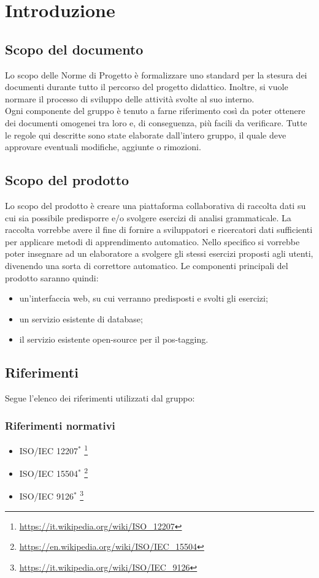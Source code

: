 \documentclass[11pt,a4paper]{article}
\begin{document}
	\newpage	

	\renewcommand  \contentsname {\Large Indice} 
	
	\tableofcontents
	\newpage
	
	\section{Introduzione}
	\subsection{Scopo del documento}
	Lo scopo delle Norme di Progetto è formalizzare uno standard per la stesura dei documenti durante tutto il percorso del progetto didattico. Inoltre, si vuole normare il processo di sviluppo delle attività svolte al suo interno. 
	\\Ogni componente del gruppo è tenuto a farne riferimento così da poter ottenere dei documenti omogenei tra loro e, di conseguenza, più facili da verificare. 
	Tutte le regole qui descritte sono state elaborate dall'intero gruppo, il quale deve approvare eventuali modifiche, aggiunte o rimozioni.
	\subsection{Scopo del prodotto}
	Lo scopo del prodotto è creare una piattaforma collaborativa di raccolta dati su cui sia possibile predisporre e/o svolgere esercizi di analisi grammaticale. La raccolta vorrebbe avere il fine di fornire a sviluppatori e ricercatori dati sufficienti per applicare metodi di apprendimento automatico. Nello specifico si vorrebbe poter insegnare ad un elaboratore a svolgere gli stessi esercizi proposti agli utenti, divenendo una sorta di correttore automatico.  
	Le componenti principali del prodotto saranno quindi:
	\begin{itemize}
		\item un'interfaccia web, su cui verranno predisposti e svolti gli esercizi;
		\item un servizio esistente di database;
		\item il servizio esistente open-source per il pos-tagging.
	\end{itemize}
	
	\subsection{Riferimenti}
	Segue l'elenco dei riferimenti utilizzati dal gruppo:
	\subsubsection{Riferimenti normativi}
	\begin{itemize}
		\item ISO/IEC 12207$^*$
		\footnote{\url {https://it.wikipedia.org/wiki/ISO\_12207}}
		
		\item ISO/IEC 15504$^*$
		\footnote{\url {https://en.wikipedia.org/wiki/ISO/IEC\_15504}}
		\item ISO/IEC 9126$^*$
		\footnote{\url {https://it.wikipedia.org/wiki/ISO/IEC\_9126}}
	\end{itemize}	
	
\end{document}

